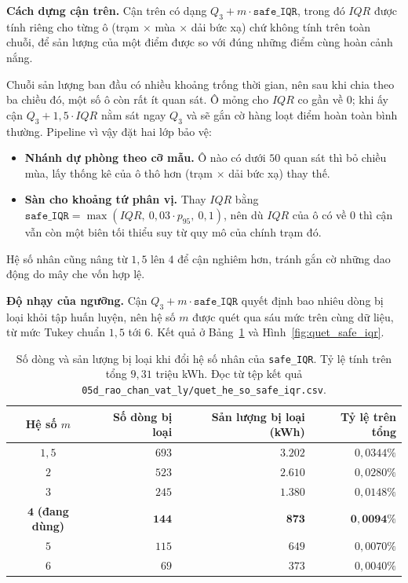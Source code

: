 \documentclass[12pt, a4paper]{report}
\begin{document}
\textbf{Cách dựng cận trên.} Cận trên có dạng $Q_3 + m \cdot \texttt{safe\_IQR}$, trong đó
$IQR$ được tính riêng cho từng ô (trạm $\times$ mùa $\times$ dải bức xạ) chứ không
tính trên toàn chuỗi, để sản lượng của một điểm được so với đúng những điểm cùng hoàn cảnh
nắng.

Chuỗi sản lượng ban đầu có nhiều khoảng trống thời gian, nên sau khi chia theo ba chiều đó,
một số ô còn rất ít quan sát. Ô mỏng cho $IQR$ co gần về $0$; khi ấy cận
$Q_3 + 1{,}5 \cdot IQR$ nằm sát ngay $Q_3$ và sẽ gắn cờ hàng loạt điểm hoàn toàn bình
thường. Pipeline vì vậy đặt hai lớp bảo vệ:

\begin{itemize}
    \item \textbf{Nhánh dự phòng theo cỡ mẫu.} Ô nào có dưới $50$ quan sát thì bỏ chiều mùa,
    lấy thống kê của ô thô hơn (trạm $\times$ dải bức xạ) thay thế.
    \item \textbf{Sàn cho khoảng tứ phân vị.} Thay $IQR$ bằng
    $\texttt{safe\_IQR} = \max(IQR,\ 0{,}03 \cdot p_{95},\ 0{,}1)$, nên dù $IQR$ của ô có về
    $0$ thì cận vẫn còn một biên tối thiểu suy từ quy mô của chính trạm đó.
\end{itemize}

Hệ số nhân cũng nâng từ $1{,}5$ lên $4$ để cận nghiêm hơn, tránh gắn cờ những dao động do
mây che vốn hợp lệ.

\textbf{Độ nhạy của ngưỡng.} Cận $Q_3 + m \cdot \texttt{safe\_IQR}$ quyết định bao nhiêu
dòng bị loại khỏi tập huấn luyện, nên hệ số $m$ được quét qua sáu mức trên cùng dữ liệu,
từ mức Tukey chuẩn $1{,}5$ tới $6$. Kết quả ở Bảng~\ref{tab:quet_safe_iqr} và
Hình~\ref{fig:quet_safe_iqr}.

\begin{table}[htbp]
\centering
\caption{Số dòng và sản lượng bị loại khi đổi hệ số nhân của \texttt{safe\_IQR}. Tỷ lệ tính
trên tổng $9{,}31$ triệu kWh. Đọc từ tệp kết quả
\texttt{05d\_rao\_chan\_vat\_ly/quet\_he\_so\_safe\_iqr.csv}.}
\label{tab:quet_safe_iqr}
\small
\begin{tabular}{c r r r}
\toprule
\textbf{Hệ số $m$} & \textbf{Số dòng bị loại} & \textbf{Sản lượng bị loại (kWh)} & \textbf{Tỷ lệ trên tổng} \\
\midrule
$1{,}5$ & $693$ & $3.202$ & $0{,}0344\%$ \\
$2$     & $523$ & $2.610$ & $0{,}0280\%$ \\
$3$     & $245$ & $1.380$ & $0{,}0148\%$ \\
$\mathbf{4}$ \textbf{(đang dùng)} & $\mathbf{144}$ & $\mathbf{873}$ & $\mathbf{0{,}0094\%}$ \\
$5$     & $115$ & $649$   & $0{,}0070\%$ \\
$6$     & $69$  & $373$   & $0{,}0040\%$ \\
\bottomrule
\end{tabular}
\caption[Số dòng và sản lượng bị loại khi đổi hệ số nhân của \texttt{safe\_IQR}]{Số dòng và sản lượng bị loại khi đổi hệ số nhân của \texttt{safe\_IQR}. Tỷ lệ tính
trên tổng $9{,}31$ triệu kWh. Đọc từ tệp kết quả
\texttt{05d\_rao\_chan\_vat\_ly/quet\_he\_so\_safe\_iqr.csv}.}
\label{tab:quet_safe_iqr}
\end{table}
\end{document}
